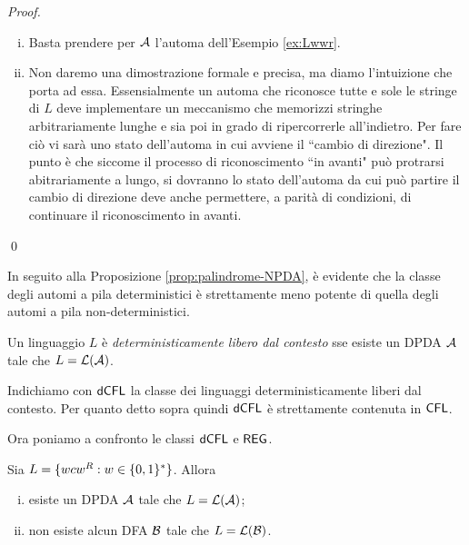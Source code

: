 \documentclass[runningheads,a4paper]{llncs}
\begin{document}
\begin{proof}
\begin{enumerate}[(i)]
\item Basta prendere per $\mathcal{A}$ l'automa dell'Esempio \ref{ex:Lwwr}.
\item Non daremo una dimostrazione formale e precisa, ma diamo l'intuizione che porta ad essa. Essensialmente un automa che riconosce tutte e sole le stringe di $L$ deve implementare un meccanismo che memorizzi stringhe arbitrariamente lunghe e sia poi in grado di ripercorrerle all'indietro. Per fare ci\`{o} vi sar\`{a} uno stato dell'automa in cui avviene il ``cambio di direzione". Il punto \`{e} che siccome il processo di riconoscimento ``in avanti" pu\`{o} protrarsi abitrariamente a lungo, si dovranno lo stato dell'automa da cui pu\`{o} partire il cambio di direzione deve anche permettere, a parit\`{a} di condizioni, di continuare il riconoscimento in avanti.
\end{enumerate}
\qed\end{proof}

In seguito alla Proposizione \ref{prop:palindrome-NPDA}, \`{e} evidente che la classe degli automi a pila deterministici \`{e} strettamente meno potente di quella degli automi a pila non-deterministici.

\begin{definition}\label{def:ling-dCFL}
Un linguaggio $L$ \`{e} \emph{deterministicamente libero dal contesto} sse esiste un DPDA $\mathcal{A}$ tale che $L = \mathcal{L}(\mathcal{A})$.
\end{definition}

Indichiamo con $\mathsf{dCFL}$ la classe dei linguaggi deterministicamente liberi dal contesto. Per quanto detto sopra quindi $\mathsf{dCFL}$ \`{e} strettamente contenuta in $\mathsf{CFL}$.

Ora poniamo a confronto le classi $\mathsf{dCFL}$ e $\mathsf{REG}$.

\begin{proposition}\label{prop:c-palindrome-DPDA}
Sia $L = \{wcw^R : w \in \{0,1\}^* \}$. Allora
\begin{enumerate}[(i)]
  \item esiste un DPDA $\mathcal{A}$ tale che $L=\mathcal{L}(\mathcal{A})$;
  \item non esiste alcun DFA $\mathcal{B}$ tale che $L =\mathcal{L}(\mathcal{B})$.
\end{enumerate}
\end{proposition}
\end{document}
